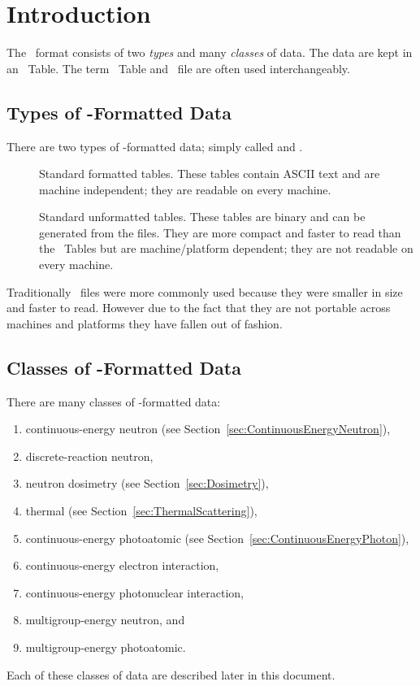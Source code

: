 \section{Introduction}\label{sec:Introduction}
The \ACE\ format consists of two \emph{types} and many \emph{classes} of data. The data are kept in an \ACE\ Table. The term \ACE\ Table and \ACE\ file are often used interchangeably.

\subsection{Types of \ACE-Formatted Data}
There are two types of \ACE-formatted data; simply called  and .
\begin{description}
  \item[] Standard formatted tables. These tables contain ASCII text and are machine independent; they are readable on every machine. 
  \item[] Standard unformatted tables. These tables are binary and can be generated from the  files. They are more compact and faster to read than the  \ACE\ Tables
 but are machine/platform dependent; they are not readable on every machine. 
\end{description}
Traditionally
  \ACE\ files were more commonly used because they were smaller in size and faster to read. However
 due to the fact that they are not portable across machines and platforms they have fallen out of fashion.

\subsection{Classes of \ACE-Formatted Data}
There are many classes of \ACE-formatted data:
\begin{enumerate}
  \item continuous-energy neutron (see Section~\ref{sec:ContinuousEnergyNeutron}),
  \item discrete-reaction neutron,
  \item neutron dosimetry (see Section~\ref{sec:Dosimetry}),
  \item \SaB thermal (see Section~\ref{sec:ThermalScattering}),
  \item continuous-energy photoatomic (see Section~\ref{sec:ContinuousEnergyPhoton}),
  \item continuous-energy electron interaction,
  \item continuous-energy photonuclear interaction,
  \item multigroup-energy neutron, and
  \item multigroup-energy photoatomic.
\end{enumerate}
Each of these classes of data are described later in this document.

